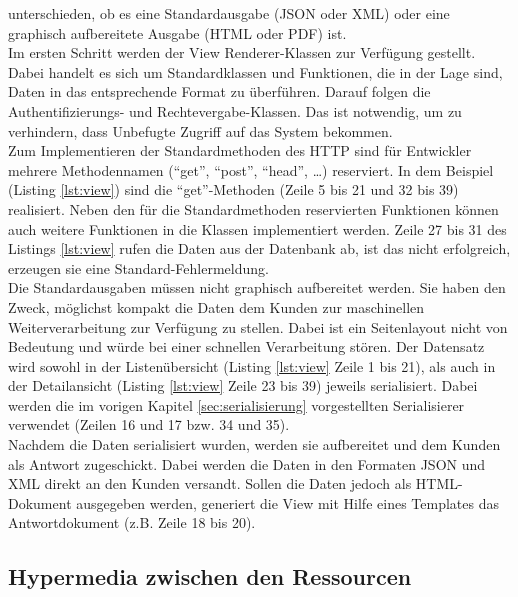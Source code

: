 unterschieden, ob es eine Standardausgabe (\ac{JSON} oder \ac{XML}) oder eine
graphisch aufbereitete Ausgabe (\ac{HTML} oder \ac{PDF}) ist.
\\
Im ersten Schritt werden der View Renderer-Klassen zur Verfügung gestellt. Dabei
handelt es sich um Standardklassen und Funktionen, die in der Lage sind, Daten
in das entsprechende Format zu überführen. Darauf folgen die Authentifizierungs-
und Rechtevergabe-Klassen. Das ist notwendig, um zu verhindern, dass Unbefugte
Zugriff auf das System bekommen.
\\
Zum Implementieren der Standardmethoden des \ac{HTTP} sind für Entwickler
mehrere Methodennamen ("`get"', "`post"', "`head"', \ldots) reserviert. In dem
Beispiel (Listing \ref{lst:view}) sind die "`get"'-Methoden (Zeile 5 bis 21 und
32 bis 39) realisiert.
Neben den für die Standardmethoden reservierten Funktionen können auch weitere
Funktionen in die Klassen implementiert werden. Zeile 27 bis 31 des Listings
\ref{lst:view} rufen die Daten aus der Datenbank ab, ist das nicht erfolgreich,
erzeugen sie eine Standard-Fehlermeldung.
\\
Die Standardausgaben müssen nicht graphisch aufbereitet werden. Sie haben den
Zweck, möglichst kompakt die Daten dem Kunden zur maschinellen
Weiterverarbeitung zur Verfügung zu stellen. Dabei ist ein Seitenlayout nicht von Bedeutung und
würde bei einer schnellen Verarbeitung stören. Der Datensatz wird sowohl in
der Listenübersicht (Listing \ref{lst:view} Zeile 1 bis 21), als auch in der
Detailansicht (Listing \ref{lst:view} Zeile 23 bis 39) jeweils serialisiert.
Dabei werden die im vorigen Kapitel \ref{sec:serialisierung} vorgestellten
Serialisierer verwendet (Zeilen 16 und 17 bzw. 34 und 35).
\\
Nachdem die Daten serialisiert wurden, werden sie aufbereitet und dem Kunden als
Antwort zugeschickt. Dabei werden die Daten in den Formaten \ac{JSON} und
\ac{XML} direkt an den Kunden versandt. Sollen die Daten jedoch als
\ac{HTML}-Dokument ausgegeben werden, generiert die View mit Hilfe eines
Templates das Antwortdokument (z.B. Zeile 18 bis 20).

\subsection{Hypermedia zwischen den Ressourcen}
\label{sec:hypermedia}

